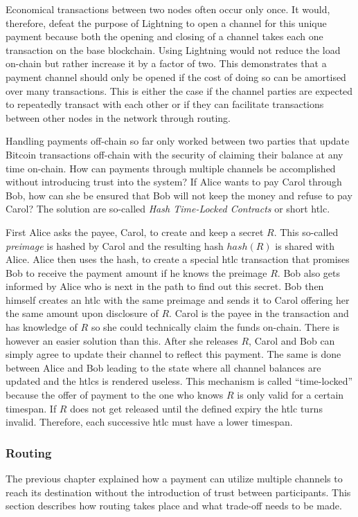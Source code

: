\documentclass[final]{fhnwreport}       %
\begin{document}
Economical transactions between two nodes often occur only once. It would, therefore, defeat the purpose of Lightning to open a channel for this unique payment because both the opening and closing of a channel takes each one transaction on the base \gls{blockchain}. Using Lightning would not reduce the load on-chain but rather increase it by a factor of two. This demonstrates that a payment channel should only be opened if the cost of doing so can be amortised over many transactions. This is either the case if the channel parties are expected to repeatedly transact with each other or if they can facilitate transactions between other nodes in the network through routing. 

Handling payments off-chain so far only worked between two parties that update Bitcoin transactions off-chain with the security of claiming their balance at any time on-chain. How can payments through multiple channels be accomplished without introducing trust into the system? If Alice wants to pay Carol through Bob, how can she be ensured that Bob will not keep the money and refuse to pay Carol? The solution are so-called \emph{Hash Time-Locked Contracts} or short \gls{htlc}.

First Alice asks the payee, Carol, to create and keep a secret $R$. This so-called \emph{\gls{preimage}} is hashed by Carol and the resulting \gls{hash} $hash(R)$ is shared with Alice. Alice then uses the \gls{hash}, to create a special \gls{htlc} transaction that promises Bob to receive the payment amount if he knows the preimage $R$. Bob also gets informed by Alice who is next in the path to find out this secret. Bob then himself creates an \gls{htlc} with the same preimage and sends it to Carol offering her the same amount upon disclosure of $R$. Carol is the payee in the transaction and has knowledge of $R$ so she could technically claim the funds on-chain. There is however an easier solution than this. After she releases $R$, Carol and Bob can simply agree to update their channel to reflect this payment. The same is done between Alice and Bob leading to the state where all channel balances are updated and the \gls{htlc}s is rendered useless. This mechanism is called ``time-locked'' because the offer of payment to the one who knows $R$ is only valid for a certain timespan. If $R$ does not get released until the defined expiry the \gls{htlc} turns invalid. Therefore, each successive \gls{htlc} must have a lower timespan.

\subsubsection{Routing}\label{subsec:routing}
The previous chapter explained how a payment can utilize multiple channels to reach its destination without the introduction of trust between participants. This section describes how routing takes place and what trade-off needs to be made.
\end{document}
